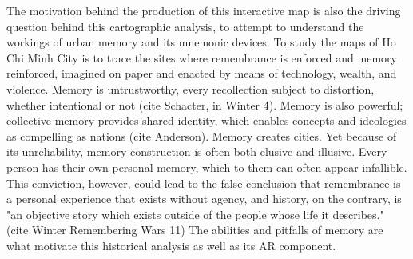 The motivation behind the production of this interactive map is also the driving question behind this cartographic analysis, to  attempt to understand the workings of urban memory and its mnemonic devices. To study the maps of Ho Chi Minh City is to trace the sites where remembrance is enforced and memory reinforced, imagined on paper and enacted by means of technology,  wealth, and violence. Memory is untrustworthy, every recollection subject to distortion, whether intentional or not (cite Schacter, in Winter 4). Memory is also powerful; collective memory provides shared identity, which enables concepts and ideologies as compelling as nations (cite Anderson). Memory creates cities. Yet because of its unreliability, memory construction is often both elusive and illusive. Every person has their own personal memory, which to them can often appear infallible. This conviction, however, could lead to the false conclusion that remembrance is a personal experience that exists without agency, and history, on the contrary, is "an objective story which exists outside of the people whose life it describes." (cite Winter Remembering Wars 11) The abilities and pitfalls of memory are what motivate this historical analysis as well as its AR component.
